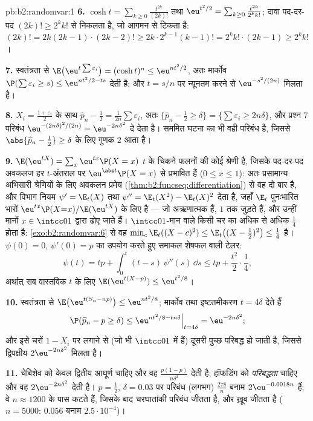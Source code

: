 \begin{solution}{pb:b2:randomvar:1}
\textbf{6.} $\cosh t = \sum_{k\geq0}\frac{t^{2k}}{(2k)!}$ तथा $\eu^{t^2/2} = \sum_{k\geq0}\frac{t^{2k}}{2^kk!}$; दावा पद-दर-पद $(2k)! \geq 2^kk!$ से निकलता है, जो आगमन
से टिकता है: $(2k)! = 2k(2k-1)\cdot(2k-2)! \geq 2k\cdot
2^{k-1}(k-1)! = 2^kk!\cdot(2k-1) \geq 2^kk!$।

\textbf{7.} स्वतंत्रता से $\E\bigl(\eu^{t\sum\varepsilon_i}
\bigr) = (\cosh t)^n \leq \eu^{nt^2/2}$, अतः मार्कोव $\P(\sum\varepsilon_i \geq s) \leq \eu^{nt^2/2 - ts}$ देती है; और $t = s/n$ पर
न्यूनतम करने से $\eu^{-s^2/(2n)}$ मिलता है।

\textbf{8.} $X_i = \frac{1 + \varepsilon_i}2$ के साथ $\widehat
p_n - \frac12 = \frac1{2n}\sum\varepsilon_i$, अतः $\{\widehat p_n - \frac12 \geq \delta\} =
\{\sum\varepsilon_i \geq 2n\delta\}$, और प्रश्न 7 परिबंध $\eu^{-(2n\delta)^2/(2n)} = \eu^{-2n\delta^2}$ दे
देता है। सममित घटना का भी वही परिबंध है, जिससे $\abs{\widehat p_n - \frac12} \geq \delta$ के लिए गुणक $2$
आता है।

\textbf{9.} $\E(\eu^{tX}) = \sum_x\eu^{tx}\P(X = x)$ $t$ के चिकने फलनों की कोई श्रेणी है, जिसके
पद-दर-पद अवकलज हर  $t$-अंतराल पर $\eu^{\abs t}\P(X = x)$ से प्रभावित हैं ($0 \leq x \leq 1$):
अतः प्रसामान्य अभिसारी श्रेणियों के लिए अवकलन प्रमेय (\cref{thm:b2:funcseq:differentiation}) से वह
दो बार  है, और विभाग नियम $\psi' = \E_t(X)$ तथा $\psi'' = \E_t(X^2) - \E_t(X)^2$ देता है, जहाँ $\E_t$
पुनःभारित भारों $\eu^{tx}\P(X{=}x)/\E(\eu^{tX})$ के लिए  है --- जो अऋणात्मक हैं, $1$
तक जुड़ते हैं, और उन्हीं मानों $x \in \intcc01$ द्वारा ढोए जाते हैं। $\intcc01$-मान
वाले किसी चर का  अधिक से अधिक $\frac14$ होता है: \cref{exo:b2:randomvar:6} से वह $\min_c\E_t((X - c)^2) \leq
\E_t\bigl((X - \tfrac12)^2\bigr) \leq \tfrac14$
है। $\psi(0) = 0$, $\psi'(0) = p$ का उपयोग करते हुए समाकल शेषफल वाली टेलर:
\[
\psi(t) = tp + \int_0^t(t - s)\,\psi''(s)\,\dd s
\leq tp + \frac{t^2}2\cdot\frac14,
\]
अर्थात् सब वास्तविक $t$ के लिए $\E(\eu^{t(X - p)}) \leq \eu^{t^2/8}$।

\textbf{10.} स्वतंत्रता से $\E\bigl(\eu^{t(S_n -
np)}\bigr) \leq \eu^{nt^2/8}$; मार्कोव तथा इष्टतमीकरण $t
= 4\delta$ देते
हैं
\[
\P(\widehat p_n - p \geq \delta)
\leq \eu^{nt^2/8 - tn\delta}\Big|_{t = 4\delta}
= \eu^{-2n\delta^2};
\]
और इसे चरों $1 - X_i$ पर लगाने से (जो भी $\intcc01$ में हैं) दूसरी पुच्छ परिबद्ध
हो जाती है, जिससे द्विपक्षीय $2\eu^{-2n\delta^2}$ मिलता है।

\textbf{11.} चेबिशेव को केवल द्वितीय आघूर्ण चाहिए और वह $\frac{p(1-p)}{n\delta^2}$ देती
है; हॉफडिंग को \emph{परिबद्धता} चाहिए और वह $2\eu^{-2n\delta^2}$ देती है। $p =
\frac12$, $\delta = 0.03$
पर परिबंध (लगभग) $\frac{278}{n}$ बनाम $2\eu^{-0.0018n}$ हैं; वे $n \approx 1200$ के पास कटते हैं, जिसके
बाद चरघातांकी परिबंध जीतता है, और ख़ूब जीतता है ($n = 5000$: $0.056$ बनाम
$2.5\cdot10^{-4}$)।


\end{solution}
